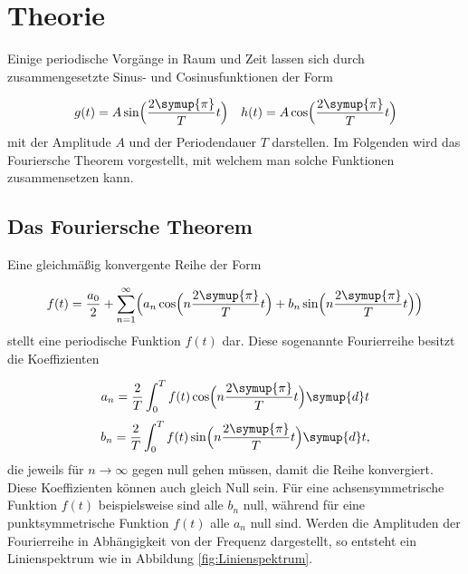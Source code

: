 \section{Theorie}
\label{sec:Theorie}

Einige periodische Vorgänge in Raum und Zeit lassen sich durch
zusammengesetzte Sinus- und Cosinusfunktionen der Form

\begin{align}
  g(t) & = A\sin \Bigl(\frac{2\symup{\pi}}{T}t\Bigr) & h(t) & =
  A\cos \Bigl(\frac{2\symup{\pi}}{T}t\Bigr) \\
\end{align}
mit der Amplitude $A$ und der Periodendauer $T$ darstellen. Im Folgenden
wird das Fouriersche Theorem vorgestellt, mit welchem man solche Funktionen
zusammensetzen kann.

\subsection{Das Fouriersche Theorem}

Eine gleichmäßig konvergente Reihe der Form

\begin{equation}
  f(t) = \frac{a_0}{2} + \sum_{n=1}^{\infty} \Bigl(a_n \cos
  \Bigl(n\frac{2\symup{\pi}}{T}t\Bigr)
  + b_n \sin \Bigl(n\frac{2\symup{\pi}}{T}t\Bigr)\Bigr)
\end{equation}
stellt eine periodische Funktion $f(t)$ dar.
Diese sogenannte Fourierreihe besitzt die Koeffizienten

\begin{equation}
  a_n = \frac{2}{T}
  \int_{0}^{T} f(t) \cos \Bigl(n\frac{2\symup{\pi}}{T}t\Bigr) \symup{d}t
  \label{eqn:an}
\end{equation}
\begin{equation}
  b_n = \frac{2}{T}
  \int_{0}^{T} f(t) \sin \Bigl(n\frac{2\symup{\pi}}{T}t\Bigr) \symup{d}t,
  \label{eqn:bn}
\end{equation}
die jeweils für $n \to \infty$ gegen null gehen müssen, damit die Reihe
konvergiert. Diese Koeffizienten können auch gleich Null sein.
Für eine achsensymmetrische Funktion $f(t)$ beispielsweise sind alle $b_n$ null,
während für eine punktsymmetrische Funktion $f(t)$ alle $a_n$ null sind.
Werden die Amplituden der Fourierreihe in Abhängigkeit von der Frequenz
dargestellt,
so entsteht ein Linienspektrum wie in Abbildung \ref{fig:Linienspektrum}.

\newpage

